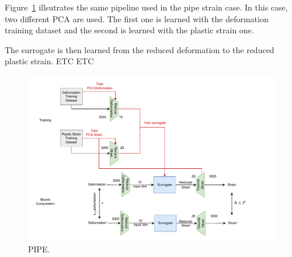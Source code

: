 Figure~\ref{fig.PIPE} illsutrates the same pipeline used in the pipe strain case. In this case, two different PCA are used. The first one is learned with the deformation training dataset and the second is learned with the plastic strain one. 

The surrogate is then learned from the reduced deformation to the reduced plastic strain. ETC ETC

\begin{figure}[]
	\centering
	\includegraphics[scale=0.9]{PIPE.pdf} \hspace{1.5cm}
	\caption{PIPE.}
	\label{fig.PIPE}
\end{figure}	
